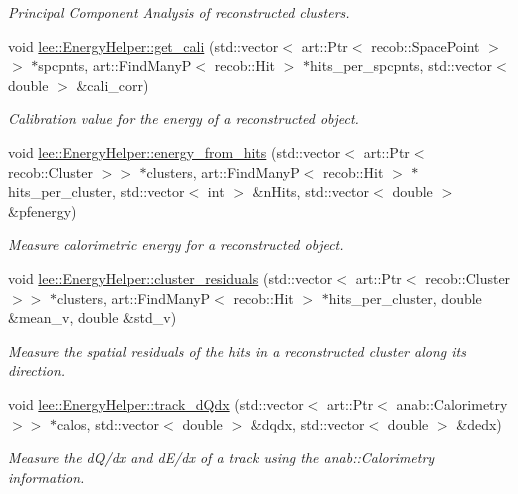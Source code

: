 \begin{DoxyCompactItemize}
\begin{DoxyCompactList}\small\item\em Principal Component Analysis of reconstructed clusters. \end{DoxyCompactList}\item 
void \hyperlink{group__lee_gaf141846d9be1716bcfcf351633bdf8e7}{lee\-::\-Energy\-Helper\-::get\-\_\-cali} (std\-::vector$<$ art\-::\-Ptr$<$ recob\-::\-Space\-Point $>$$>$ $\ast$spcpnts, art\-::\-Find\-Many\-P$<$ recob\-::\-Hit $>$ $\ast$hits\-\_\-per\-\_\-spcpnts, std\-::vector$<$ double $>$ \&cali\-\_\-corr)
\begin{DoxyCompactList}\small\item\em Calibration value for the energy of a reconstructed object. \end{DoxyCompactList}\item 
void \hyperlink{group__lee_gaabbb21a3db419c9580aec4976c5137a9}{lee\-::\-Energy\-Helper\-::energy\-\_\-from\-\_\-hits} (std\-::vector$<$ art\-::\-Ptr$<$ recob\-::\-Cluster $>$$>$ $\ast$clusters, art\-::\-Find\-Many\-P$<$ recob\-::\-Hit $>$ $\ast$hits\-\_\-per\-\_\-cluster, std\-::vector$<$ int $>$ \&n\-Hits, std\-::vector$<$ double $>$ \&pfenergy)
\begin{DoxyCompactList}\small\item\em Measure calorimetric energy for a reconstructed object. \end{DoxyCompactList}\item 
void \hyperlink{group__lee_ga01205d4a5d2f8d5ad0d4d5462e0b7563}{lee\-::\-Energy\-Helper\-::cluster\-\_\-residuals} (std\-::vector$<$ art\-::\-Ptr$<$ recob\-::\-Cluster $>$$>$ $\ast$clusters, art\-::\-Find\-Many\-P$<$ recob\-::\-Hit $>$ $\ast$hits\-\_\-per\-\_\-cluster, double \&mean\-\_\-v, double \&std\-\_\-v)
\begin{DoxyCompactList}\small\item\em Measure the spatial residuals of the hits in a reconstructed cluster along its direction. \end{DoxyCompactList}\item 
void \hyperlink{group__lee_ga27cd9ba04f447b9922c56bbb320bce08}{lee\-::\-Energy\-Helper\-::track\-\_\-d\-Qdx} (std\-::vector$<$ art\-::\-Ptr$<$ anab\-::\-Calorimetry $>$$>$ $\ast$calos, std\-::vector$<$ double $>$ \&dqdx, std\-::vector$<$ double $>$ \&dedx)
\begin{DoxyCompactList}\small\item\em Measure the d\-Q/dx and d\-E/dx of a track using the anab\-::\-Calorimetry information. \end{DoxyCompactList}\item 

\end{DoxyCompactItemize}
